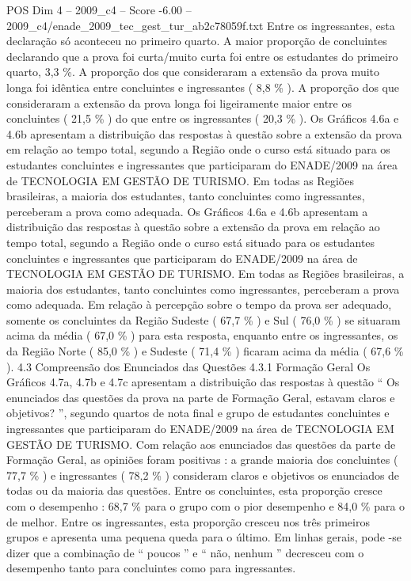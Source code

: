 \begin{textsample}{POS Dim 4 – 2009\_c4 – Score -6.00 – 2009\_c4/enade\_2009\_tec\_gest\_tur\_ab2c78059f.txt}
Entre os ingressantes, esta declaração só aconteceu no primeiro quarto.
A maior proporção de concluintes declarando que a prova foi curta/muito curta foi entre os estudantes do primeiro quarto, 3,3 \%.
A proporção dos que consideraram a extensão da prova muito longa foi idêntica entre concluintes e ingressantes ( 8,8 \% ).
A proporção dos que consideraram a extensão da prova longa foi ligeiramente maior entre os concluintes ( 21,5 \% ) do que entre os ingressantes ( 20,3 \% ).
Os Gráficos 4.6a e 4.6b apresentam a distribuição das respostas à questão sobre a extensão da prova em relação ao tempo total, segundo a Região onde o curso está situado para os estudantes concluintes e ingressantes que participaram do ENADE/2009 na área de TECNOLOGIA EM GESTÃO DE TURISMO.
Em todas as Regiões brasileiras, a maioria dos estudantes, tanto concluintes como ingressantes, perceberam a prova como adequada.
Os Gráficos 4.6a e 4.6b apresentam a distribuição das respostas à questão sobre a extensão da prova em relação ao tempo total, segundo a Região onde o curso está situado para os estudantes concluintes e ingressantes que participaram do ENADE/2009 na área de TECNOLOGIA EM GESTÃO DE TURISMO.
Em todas as Regiões brasileiras, a maioria dos estudantes, tanto concluintes como ingressantes, perceberam a prova como adequada.
Em relação à percepção sobre o tempo da prova ser adequado, somente os concluintes da Região Sudeste ( 67,7 \% ) e Sul ( 76,0 \% ) se situaram acima da média ( 67,0 \% ) para esta resposta, enquanto entre os ingressantes, os da Região Norte ( 85,0 \% ) e Sudeste ( 71,4 \% ) ficaram acima da média ( 67,6 \% ). 4.3 Compreensão dos Enunciados das Questões 4.3.1 Formação Geral Os Gráficos 4.7a, 4.7b e 4.7c apresentam a distribuição das respostas à questão “ Os enunciados das questões da prova na parte de Formação Geral, estavam claros e objetivos? ”, segundo quartos de nota final e grupo de estudantes concluintes e ingressantes que participaram do ENADE/2009 na área de TECNOLOGIA EM GESTÃO DE TURISMO.
Com relação aos enunciados das questões da parte de Formação Geral, as opiniões foram positivas : a grande maioria dos concluintes ( 77,7 \% ) e ingressantes ( 78,2 \% ) consideram claros e objetivos os enunciados de todas ou da maioria das questões.
Entre os concluintes, esta proporção cresce com o desempenho : 68,7 \% para o grupo com o pior desempenho e 84,0 \% para o de melhor.
Entre os ingressantes, esta proporção cresceu nos três primeiros grupos e apresenta uma pequena queda para o último.
Em linhas gerais, pode -se dizer que a combinação de “ poucos ” e “ não, nenhum ” decresceu com o desempenho tanto para concluintes como para ingressantes.

\end{textsample}

